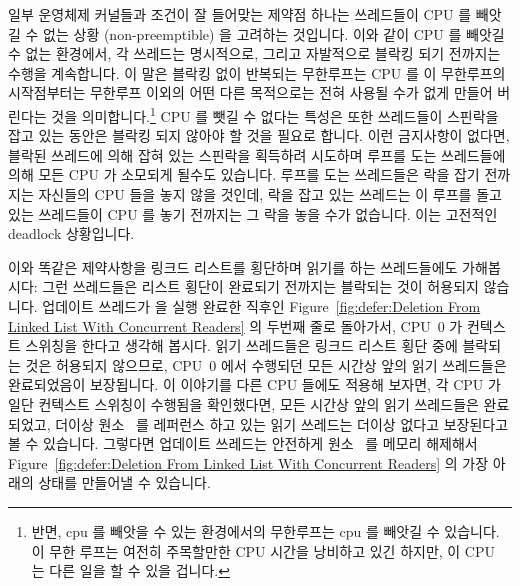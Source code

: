 일부 운영체제 커널들과 조건이 잘 들어맞는 제약점 하나는 쓰레드들이 CPU 를
빼앗길 수 없는 상황 (non-preemptible) 을 고려하는 것입니다.
이와 같이 CPU 를 빼앗길 수 없는 환경에서, 각 쓰레드는 명시적으로, 그리고
자발적으로 블락킹 되기 전까지는 수행을 계속합니다.
이 말은 블락킹 없이 반복되는 무한루프는 CPU 를 이 무한루프의 시작점부터는
무한루프 이외의 어떤 다른 목적으로는 전혀 사용될 수가 없게 만들어 버린다는 것을
의미합니다.\footnote{
	반면, cpu 를 빼앗을 수 있는 환경에서의 무한루프는 cpu 를 빼앗길 수
	있습니다.
	이 무한 루프는 여전히 주목할만한 CPU 시간을 낭비하고 있긴 하지만, 이
	CPU 는 다른 일을 할 수 있을 겁니다.}
CPU 를 뺏길 수 없다는 특성은 또한 쓰레드들이 스핀락을 잡고 있는 동안은 블락킹
되지 않아야 할 것을 필요로 합니다.
이런 금지사항이 없다면, 블락된 쓰레드에 의해 잡혀 있는 스핀락을 획득하려
시도하며 루프를 도는 쓰레드들에 의해 모든 CPU 가 소모되게 될수도 있습니다.
루프를 도는 쓰레드들은 락을 잡기 전까지는 자신들의 CPU 들을 놓지 않을 것인데,
락을 잡고 있는 쓰레드는 이 루프를 돌고 있는 쓰레드들이 CPU 를 놓기 전까지는 그
락을 놓을 수가 없습니다.
이는 고전적인 deadlock 상황입니다.

이와 똑같은 제약사항을 링크드 리스트를 횡단하며 읽기를 하는 쓰레드들에도
가해봅시다: 그런 쓰레드들은 리스트 횡단이 완료되기 전까지는 블락되는 것이
허용되지 않습니다.
업데이트 쓰레드가  을 실행 완료한 직후인
Figure~\ref{fig:defer:Deletion From Linked List With Concurrent Readers} 의
두번째 줄로 돌아가서, CPU~0 가 컨텍스트 스위칭을 한다고 생각해 봅시다.
읽기 쓰레드들은 링크드 리스트 횡단 중에 블락되는 것은 허용되지 않으므로, CPU~0
에서 수행되던 모든 시간상 앞의 읽기 쓰레드들은 완료되었음이 보장됩니다.
이 이야기를 다른 CPU 들에도 적용해 보자면, 각 CPU 가 일단 컨텍스트 스위칭이
수행됨을 확인했다면, 모든 시간상 앞의 읽기 쓰레드들은 완료되었고, 더이상
원소~ 를 레퍼런스 하고 있는 읽기 쓰레드는 더이상 없다고 보장된다고 볼 수
있습니다.
그렇다면 업데이트 쓰레드는 안전하게 원소~ 를 메모리 해제해서
Figure~\ref{fig:defer:Deletion From Linked List With Concurrent Readers} 의
가장 아래의 상태를 만들어낼 수 있습니다.
\iffalse

